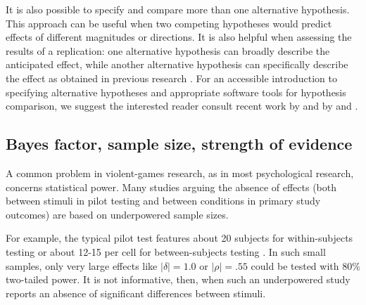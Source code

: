 \documentclass[man]{apa6}
\begin{document}
It is also possible to specify and compare more than one alternative hypothesis. This approach can be useful when two competing hypotheses would predict effects of different magnitudes or directions. It is also helpful when assessing the results of a replication: one alternative hypothesis can broadly describe the anticipated effect, while another alternative hypothesis can specifically describe the effect as obtained in previous research \citep[see][for an example]{Boekel:etal:2014}. For an accessible introduction to specifying alternative hypotheses and appropriate software tools for hypothesis comparison, we suggest the interested reader consult recent work by \citet{Dienes:2011,Dienes:2014} and by \citet{Rouder:Morey:2012} and \citet{Rouder:etal:2012}.

\subsection{Bayes factor, sample size, strength of evidence}
A common problem in violent-games research, as in most psychological research, concerns statistical power. Many studies arguing the absence of effects (both between stimuli in pilot testing and between conditions in primary study outcomes) are based on underpowered sample sizes. 

For example, the typical pilot test features about 20 subjects for within-subjects testing \citep[e.g.,][]{Arriaga:etal:2008} or about 12-15 per cell for between-subjects testing \citep[e.g.,][]{Anderson:etal:2004,Valadez:Ferguson:2012}. In such small samples, only very large effects like $|\delta| = 1.0$ or $|\rho| = .55$ could be tested with 80\% two-tailed power. It is not informative, then, when such an underpowered study reports an absence of significant differences between stimuli. 
\end{document}

